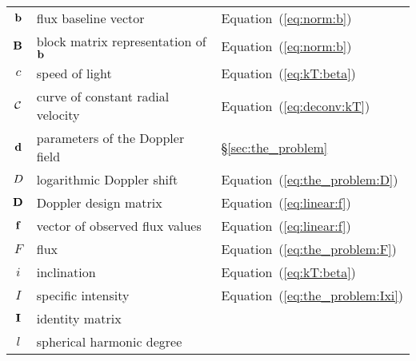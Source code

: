 \documentclass[modern]{aastex62}
\begin{document}
\begin{center}
\begin{longtable}{cll}
        ${\mathbf{b}}$                                          & flux baseline vector                                         & Equation~(\ref{eq:norm:b})                 \\
        ${\mathbf{B}}$                                          & block matrix representation of ${\mathbf{b}}$                    & Equation~(\ref{eq:norm:b})                 \\
        $c$                                                 & speed of light                                               & Equation~(\ref{eq:kT:beta})                \\
        $\mathcal{C}$                                            & curve of constant radial velocity                            & Equation~(\ref{eq:deconv:kT})              \\
        ${\mathbf{d}}$                                            & parameters of the Doppler field                              & \S\ref{sec:the_problem}                    \\
        $D$                                                & logarithmic Doppler shift                                    & Equation~(\ref{eq:the_problem:D})          \\
        ${\mathbf{D}}$                                          & Doppler design matrix                                        & Equation~(\ref{eq:linear:f})               \\
        ${\mathbf{f}}$                                          & vector of observed flux values                               & Equation~(\ref{eq:linear:f})               \\
        $F$                                                 & flux                                                         & Equation~(\ref{eq:the_problem:F})          \\
        $i$                                                 & inclination                                                  & Equation~(\ref{eq:kT:beta})                \\
        $I$                                                 & specific intensity                                           & Equation~(\ref{eq:the_problem:Ixi})        \\
        ${\mathbf{I}}$                                          & identity matrix                                              &                                            \\
        $l$                                                 & spherical harmonic degree                                    &                                            \\

\end{longtable}
\end{center}
\end{document}
